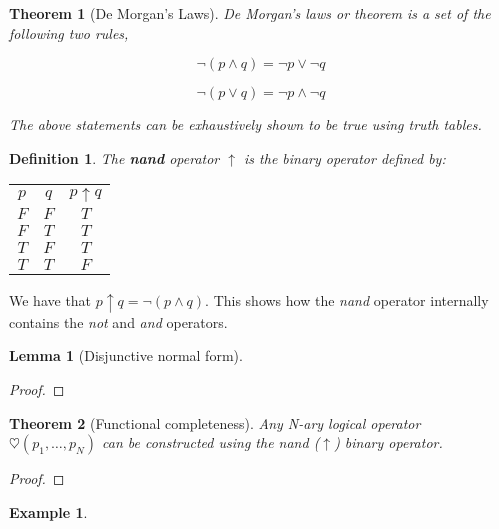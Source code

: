 \documentclass[12pt]{article}
\newtheorem{definition}{Definition}[section]
\newtheorem{theorem}{Theorem}[section]
\newtheorem{lemma}{Lemma}[section]
\newtheorem{example}{Example}[section]
\begin{document}
\begin{shaded}
\begin{theorem}[De Morgan's Laws]
De Morgan's laws or theorem is a set of the following two rules,

$$\lnot \left( p \land q \right) = \lnot p \lor \lnot q$$

$$\lnot \left( p \lor q \right) = \lnot p \land \lnot q$$

The above statements can be exhaustively shown to be true using truth tables.
\end{theorem}
\end{shaded}

\begin{definition}
The \textbf{nand} operator $\uparrow$ is the binary operator defined by:

\begin{center}
\begin{tabular}{|c|c||c|}
\hline
$p$ & $q$ & $p \uparrow q$ \\
\hhline{|=|=||=|}
$F$ & $F$ & $T$ \\
\hline
$F$ & $T$ & $T$ \\
\hline
$T$ & $F$ & $T$ \\
\hline
$T$ & $T$ & $F$ \\
\hline
\end{tabular}
\end{center}
\end{definition}

We have that $p \uparrow q = \lnot \left( p \land q \right)$. This shows how the \emph{nand} operator internally contains the \emph{not} and \emph{and} operators.

\begin{lemma}[Disjunctive normal form]

\end{lemma}
\begin{proof}

\end{proof}

\begin{theorem}[Functional completeness]
Any N-ary logical operator $\heartsuit \left( p_1, \dots, p_N \right)$ can be constructed using the \emph{nand} ($\uparrow$) binary operator.
\end{theorem}
\begin{proof}

\end{proof}
\begin{example}

\end{example}
\end{document}

